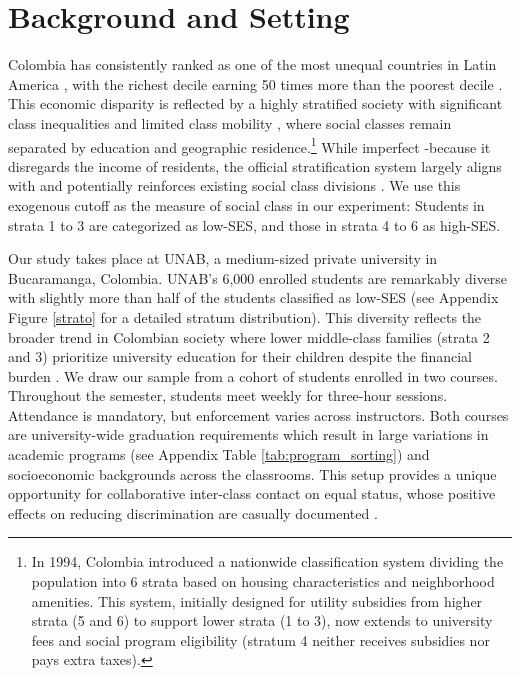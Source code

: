 \documentclass[11pt,a4paper,oneside]{article}
\begin{document}
\section{Background and Setting} \label{s2}
Colombia has consistently ranked as one of the most unequal countries in Latin America \citep{barretoherrera2024regional}, with the richest decile earning 50 times more than the poorest decile \citep{comisioneconomicaparaamericalatinayel2023}. This economic disparity is reflected by a highly stratified society with significant class inequalities and limited class mobility \citep{angulo2012movilidad,garcia2015loteria}, where social classes remain separated by education and geographic residence.\footnote{In 1994, Colombia introduced a nationwide classification system dividing the population into 6 strata based on housing characteristics and neighborhood amenities. This system, initially designed for utility subsidies from higher strata (5 and 6) to support lower strata (1 to 3), now extends to university fees and social program eligibility (stratum 4 neither receives subsidies nor pays extra taxes).} While imperfect -because it disregards the income of residents, the official stratification system largely aligns with and potentially reinforces existing social class divisions \citep{uribe2008estratificacion, guevara2019spatializing}. We use this exogenous cutoff as the measure of social class in our experiment: Students in strata 1 to 3 are categorized as low-SES, and those in strata 4 to 6 as high-SES.

Our study takes place at UNAB, a medium-sized private university in Bucaramanga, Colombia. UNAB's 6,000 enrolled students are remarkably diverse with slightly more than half of the students classified as low-SES (see Appendix Figure \ref{strato} for a detailed stratum distribution). This diversity reflects the broader trend in Colombian society where lower middle-class families (strata 2 and 3) prioritize university education for their children despite the financial burden \citep[p. 103]{hudson_colombia_2010}. We draw our sample from a cohort of students enrolled in two courses. Throughout the semester, students meet weekly for three-hour sessions. Attendance is mandatory, but enforcement varies across instructors. Both courses are university-wide graduation requirements which result in large variations in academic programs (see Appendix Table \ref{tab:program_sorting}) and socioeconomic backgrounds across the classrooms. This setup provides a unique opportunity for collaborative inter-class contact on equal status, whose positive effects on reducing discrimination are casually documented \citep{rao2019familiarity, mousa2020building,lowe2021types}.
\end{document}
